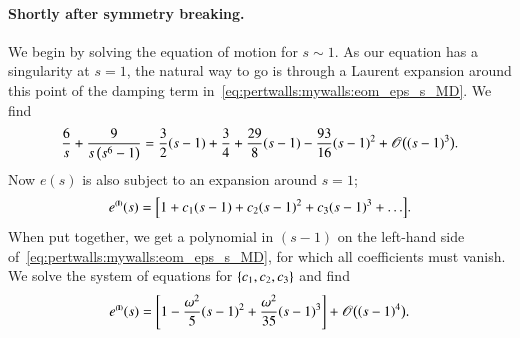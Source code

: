     \paragraph{Shortly after symmetry breaking.} %
    We begin by solving the equation of motion for $s\sim 1$. As our equation has a singularity at $s=1$, the natural way to go is through a Laurent expansion around this point of the damping term in~\cref{eq:pertwalls:mywalls:eom_eps_s_MD}. We find 
    \begin{equation}
        \frac{6}{s}  +\frac{9}{s\left(s^6-1\right)} = \frac{3}{2} (s-1) + \frac{3}{4} + \frac{29}{8}(s-1)- \frac{93}{16} {(s-1)}^2 + \mathscr{O}\big({(s-1)}^3\big).
    \end{equation}
    Now $e(s)$ is also subject to an expansion around $s=1$;
    \begin{equation}
        e^{\text{\eqregimenum{I}}}(s)= \bclosed{ 1 + c_1 (s-1) + c_2 {(s-1)}^2 + c_3 {(s-1)}^3 + \dots }.
    \end{equation}
    When put together, we get a polynomial in $(s-1)$ on the left-hand side of~\cref{eq:pertwalls:mywalls:eom_eps_s_MD}, for which all coefficients must vanish. %
    We solve the system of equations for ${\left\{ c_1,c_2, c_3 \right\}} $ and find 
    \begin{equation}\label{eq:pertwalls:mywalls:eps_s_I_MD}
        e^{\text{{\tiny{\textbf{(I)}}}}}(s) = {\left[  1 - \frac{\omega^2}{5} {(s-1)}^2 + \frac{\omega^2}{35} {(s-1)}^3  \right]} + \mathscr{O}\big({\left( s-1 \right)}^4\big).
    \end{equation}




